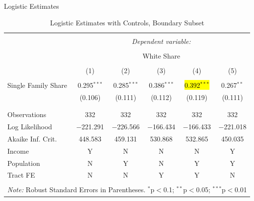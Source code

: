 \documentclass{beamer}
\makeatletter
\let\HL\hl
\renewcommand\hl{%
  \let\set@color\beamerorig@set@color
  \let\reset@color\beamerorig@reset@color
  \HL}
\makeatother
\begin{document}
\begin{frame}{Logistic Estimates}
\tiny

\begin{table}[!htbp] \centering 
  \caption{Logistic Estimates with Controls, Boundary Subset} 
  \label{tab:logit_controls_causal} 
\begin{tabular}{@{\extracolsep{5pt}}lccccc} 
\\[-1.8ex]\hline 
\hline \\[-1.8ex] 
 & \multicolumn{5}{c}{\textit{Dependent variable:}} \\ 
\cline{2-6} 
\\[-1.8ex] & \multicolumn{5}{c}{White Share} \\ 
\\[-1.8ex] & (1) & (2) & (3) & (4) & (5)\\ 
\hline \\[-1.8ex] 
 Single Family Share & 0.295$^{***}$ & 0.285$^{***}$ & 0.386$^{***}$ & \hl{0.392$^{***}$} & 0.267$^{**}$ \\ 
  & (0.106) & (0.111) & (0.112) & (0.119) & (0.111) \\ 
  & & & & & \\ 
\hline \\[-1.8ex] 
Observations & 332 & 332 & 332 & 332 & 332\\ 
Log Likelihood & $-$221.291 & $-$226.566 & $-$166.434 & $-$166.433 & $-$221.018 \\ 
Akaike Inf. Crit. & 448.583 & 459.131 & 530.868 & 532.865 & 450.035 \\ 
\hline
Income & Y & N & N & N & Y\\
Population & N & Y & N & Y & Y\\
Tract FE & N & N & Y & Y & N\\
\hline 
\hline \\[-1.8ex] 
\multicolumn{6}{l}{\textit{Note:} Robust Standard Errors in Parentheses. $^{*}$p$<$0.1; $^{**}$p$<$0.05; $^{***}$p$<$0.01} \\
\end{tabular} 
\end{table} 
    
\end{frame}
\end{document}
